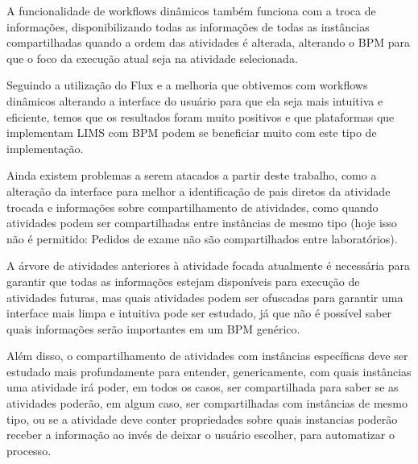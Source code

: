 A funcionalidade de workflows dinâmicos também funciona com a troca de informações, disponibilizando todas as informações de todas as instâncias compartilhadas quando a ordem das atividades é alterada, alterando o BPM para que o foco da execução atual seja na atividade selecionada.

Seguindo a utilização do Flux e a melhoria que obtivemos com workflows dinâmicos alterando a interface do usuário para que ela seja mais intuitiva e eficiente, temos que os resultados foram muito positivos e que plataformas que implementam LIMS com BPM podem se beneficiar muito com este tipo de implementação.

Ainda existem problemas a serem atacados a partir deste trabalho, como a alteração da interface para melhor a identificação de pais diretos da atividade trocada e informações sobre compartilhamento de atividades, como quando atividades podem ser compartilhadas entre instâncias de mesmo tipo (hoje isso não é permitido: Pedidos de exame não são compartilhados entre laboratórios).

A árvore de atividades anteriores à atividade focada atualmente é necessária para garantir que todas as informações estejam disponíveis para execução de atividades futuras, mas quais atividades podem ser ofuscadas para garantir uma interface mais limpa e intuitiva pode ser estudado, já que não é possível saber quais informações serão importantes em um BPM genérico.

Além disso, o compartilhamento de atividades com instâncias específicas deve ser estudado mais profundamente para entender, genericamente, com quais instâncias uma atividade irá poder, em todos os casos, ser compartilhada para saber se as atividades poderão, em algum caso, ser compartilhadas com instâncias de mesmo tipo, ou se a atividade deve conter propriedades sobre quais instancias poderão receber a informação ao invés de deixar o usuário escolher, para automatizar o processo.